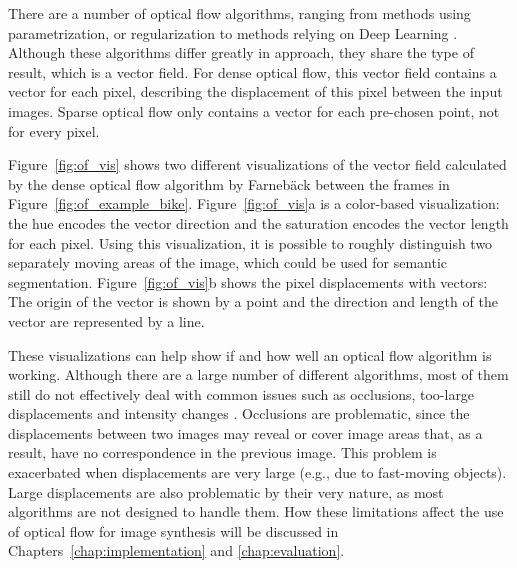 There are a number of optical flow algorithms, ranging from methods using parametrization, or regularization \cite{of-survey} to methods relying on Deep Learning \cite{of-deep}. Although these algorithms differ greatly in approach, they share the type of result, which is a vector field. For dense optical flow, this vector field contains a vector for each pixel, describing the displacement of this pixel between the input images. Sparse optical flow only contains a vector for each pre-chosen point, not for every pixel.

Figure~\ref{fig:of_vis} shows two different visualizations of the vector field calculated by the dense optical flow algorithm by Farneb\"ack \cite{farneback} between the frames in Figure~\ref{fig:of_example_bike}. Figure~\ref{fig:of_vis}a is a color-based visualization: the hue encodes the vector direction and the saturation encodes the vector length for each pixel. Using this visualization, it is possible to roughly distinguish two separately moving areas of the image, which could be used for semantic segmentation. Figure~\ref{fig:of_vis}b shows the pixel displacements with vectors: The origin of the vector is shown by a point and the direction and length of the vector are represented by a line.

These visualizations can help show if and how well an optical flow algorithm is working. Although there are a large number of different algorithms, most of them still do not effectively deal with common issues such as occlusions, too-large displacements and intensity changes \cite{of-survey}. Occlusions are problematic, since the displacements between two images may reveal or cover image areas that, as a result, have no correspondence in the previous image. This problem is exacerbated when displacements are very large (e.g., due to fast-moving objects). Large displacements are also problematic by their very nature, as most algorithms are not designed to handle them. How these limitations affect the use of optical flow for image synthesis will be discussed in Chapters~\ref{chap:implementation} and \ref{chap:evaluation}.

